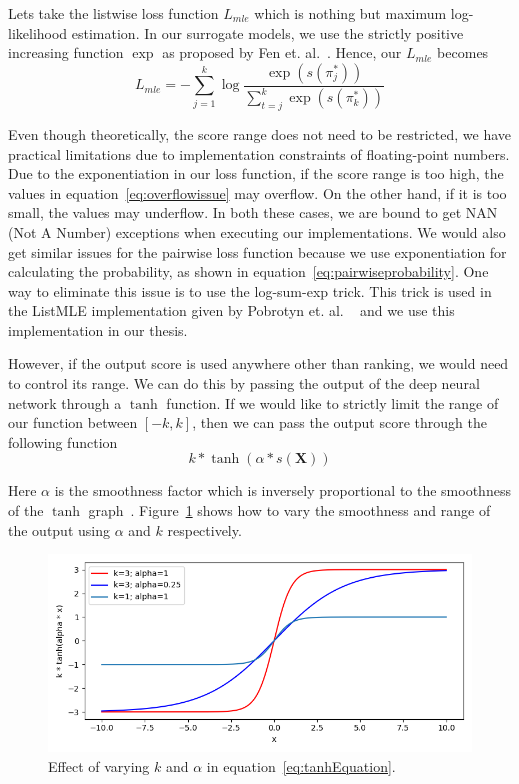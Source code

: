 \documentclass[12pt, twoside, ngerman]{report}
\begin{document}
Lets take the listwise loss function $L_{mle}$ which is nothing but maximum log-likelihood estimation. 
In our surrogate models, we use the strictly positive increasing function $\exp$ as proposed by Fen et. al.~\cite{listmlepaper}.
Hence, our $L_{mle}$ becomes 
\begin{equation}\label{eq:overflowissue}
L_{mle} = -  \sum\limits_{j=1}^{k} \log \frac{\exp(s(\pi^*_j))}{ \sum\limits_{t=j}^k \exp(s(\pi^*_k))}
\end{equation}

Even though theoretically, the score range does not need to be restricted, we have practical limitations due to implementation constraints of floating-point numbers.
Due to the exponentiation in our loss function, if the score range is too high,  the values in equation~\ref{eq:overflowissue} may overflow.
On the other hand, if it is too small, the values may underflow.
In both these cases, we are bound to get NAN (Not A Number) exceptions when executing our implementations.
We would also get similar issues for the pairwise loss function because we use exponentiation for calculating the probability, as shown in equation~\ref{eq:pairwiseprobability}.
One way to eliminate this issue is to use the log-sum-exp trick. This trick is used in the ListMLE implementation given by Pobrotyn
 et. al. ~\cite{Pobrotyn2020ContextAwareLT} and we use this implementation in our thesis.

However, if the output score is used anywhere other than ranking, we would need to control its range.
We can do this by passing the output of the deep neural network through a $\tanh$ function.
If we would like to strictly limit the range of our function between $[-k,  k]$,  then we can pass the output score through the following function
\begin{equation}\label{eq:tanhEquation}
k * \tanh(\alpha * s(\textbf{X}))
\end{equation}

Here $\alpha$ is the smoothness factor which is inversely proportional to the smoothness of the $\tanh$ graph~\cite{tanhstackoverflowanswer}.
Figure~\ref{fig:tanhGraph} shows how to vary the smoothness and range of the output using $\alpha$ and $k$ respectively.

\begin{figure}[htb]
  \centering
    \includegraphics[scale=0.5]{images/tanhGraph}
    \caption{Effect of varying $k$ and $\alpha$ in equation~\ref{eq:tanhEquation}.}
    \label{fig:tanhGraph}
\end{figure}
\end{document}
